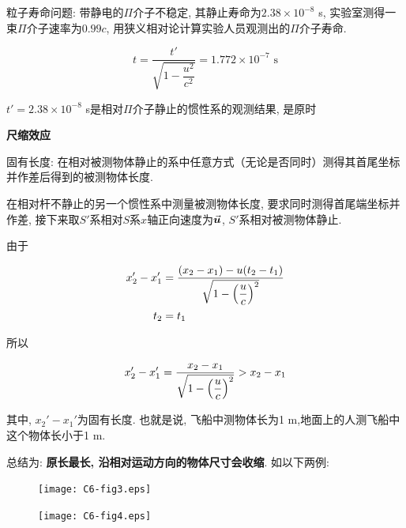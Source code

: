 \begin{example}
    粒子寿命问题: 带静电的$\Pi$介子不稳定, 其静止寿命为$2.38 \times 10^{-8}$ s, 实验室测得一束$\Pi$介子速率为$0.99c$, 用狭义相对论计算实验人员观测出的$\Pi$介子寿命. 
	
	\begin{solution}
		\begin{equation*}
			t = \dfrac{t'}{\sqrt{1 - \dfrac{u^2}{c^2}}} = 1.772 \times 10^{-7} \textrm{~s}
		\end{equation*}
	\end{solution}
	
\end{example}

\begin{note}
	
	$t' = 2.38 \times 10^{-8}$ s是相对$\Pi$介子静止的惯性系的观测结果, 是原时
\end{note}

\vskip 0.3cm

\noindent \textbf{尺缩效应}

固有长度: 在相对被测物体静止的系中任意方式（无论是否同时）测得其首尾坐标并作差后得到的被测物体长度. 

在相对杆不静止的另一个惯性系中测量被测物体长度, 要求同时测得首尾端坐标并作差, 接下来取$S'$系相对$S$系$x$轴正向速度为$\va*{u}$, $S'$系相对被测物体静止. 

由于

\begin{align}
	x_2' - x_1' &= \dfrac{\qty(x_2 - x_1) - u\qty(t_2 - t_1)}{\sqrt{1 - \qty(\dfrac{u}{c})^2}} \label{C6-eq19} \\
	t_2 &= t_1 \label{C6-eq20}
\end{align}

所以

\begin{equation}
	x_2' - x_1' = \dfrac{x_2 - x_1}{\sqrt{1 - \qty(\dfrac{u}{c})^2}} > x_2 - x_1 \label{C6-eq21}
\end{equation}

其中, $x_2' - x_1'$为固有长度. 也就是说, 飞船中测物体长为1 m,地面上的人测飞船中这个物体长小于1 m. 

总结为: \textbf{原长最长, 沿相对运动方向的物体尺寸会收缩}. 如以下两例: 

\begin{figure}[H]
	\centering
	\begin{minipage}[t]{0.48\textwidth}
		\centering
		\texttt{[image: C6-fig3.eps]}
		\label{C6-fig3}
	\end{minipage}
	\begin{minipage}[t]{0.48\textwidth}
		\centering
		\texttt{[image: C6-fig4.eps]}
		\label{C6-fig4}
	\end{minipage}
\end{figure}

